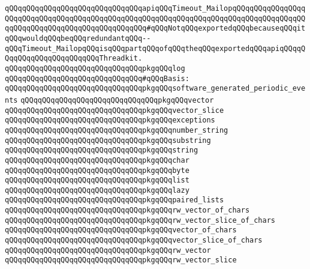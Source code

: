 \verb|qQQqqQQqqQQqqQQqqQQqqQQqqQQqqQQqapiqQQqTimeout_MailopqQQqqQQqqQQqqQQqqQQqqQQqqQQqqQQqqQQqqQQqqQQqqQQqqQQqqQQqqQQqqQQqqQQqqQQqqQQqqQQqqQQqqQQqqQQqqQQqqQQqqQQqqQQqqQQqqQQqqQQq#qQQqNotqQQqexportedqQQqbecauseqQQqitqQQqwouldqQQqbeqQQqredundantqQQq--qQQqTimeout_MailopqQQqisqQQqpartqQQqofqQQqtheqQQqexportedqQQqapiqQQqqQQqqQQqqQQqqQQqqQQqqQQqThreadkit.|\newline
\newline
\verb|qQQqqQQqqQQqqQQqqQQqqQQqqQQqqQQqpkgqQQqlog|\newline
\newline
\verb|qQQqqQQqqQQqqQQqqQQqqQQqqQQqqQQq#qQQqBasis:|\newline
\verb|qQQqqQQqqQQqqQQqqQQqqQQqqQQqqQQqpkgqQQqsoftware_generated_periodic_events|\newline
\verb|qQQqqQQqqQQqqQQqqQQqqQQqqQQqqQQqpkgqQQqvector|\newline
\verb|qQQqqQQqqQQqqQQqqQQqqQQqqQQqqQQqpkgqQQqvector_slice|\newline
\verb|qQQqqQQqqQQqqQQqqQQqqQQqqQQqqQQqpkgqQQqexceptions|\newline
\verb|qQQqqQQqqQQqqQQqqQQqqQQqqQQqqQQqpkgqQQqnumber_string|\newline
\verb|qQQqqQQqqQQqqQQqqQQqqQQqqQQqqQQqpkgqQQqsubstring|\newline
\verb|qQQqqQQqqQQqqQQqqQQqqQQqqQQqqQQqpkgqQQqstring|\newline
\verb|qQQqqQQqqQQqqQQqqQQqqQQqqQQqqQQqpkgqQQqchar|\newline
\verb|qQQqqQQqqQQqqQQqqQQqqQQqqQQqqQQqpkgqQQqbyte|\newline
\verb|qQQqqQQqqQQqqQQqqQQqqQQqqQQqqQQqpkgqQQqlist|\newline
\verb|qQQqqQQqqQQqqQQqqQQqqQQqqQQqqQQqpkgqQQqlazy|\newline
\verb|qQQqqQQqqQQqqQQqqQQqqQQqqQQqqQQqpkgqQQqpaired_lists|\newline
\verb|qQQqqQQqqQQqqQQqqQQqqQQqqQQqqQQqpkgqQQqrw_vector_of_chars|\newline
\verb|qQQqqQQqqQQqqQQqqQQqqQQqqQQqqQQqpkgqQQqrw_vector_slice_of_chars|\newline
\verb|qQQqqQQqqQQqqQQqqQQqqQQqqQQqqQQqpkgqQQqvector_of_chars|\newline
\verb|qQQqqQQqqQQqqQQqqQQqqQQqqQQqqQQqpkgqQQqvector_slice_of_chars|\newline
\verb|qQQqqQQqqQQqqQQqqQQqqQQqqQQqqQQqpkgqQQqrw_vector|\newline
\verb|qQQqqQQqqQQqqQQqqQQqqQQqqQQqqQQqpkgqQQqrw_vector_slice|\newline
